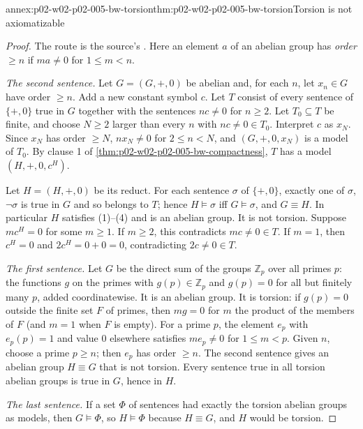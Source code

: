 \begin{annexitem}{annex:p02-w02-p02-005-bw-torsion}{thm:p02-w02-p02-005-bw-torsion}{Torsion is not axiomatizable}
\begin{proof}
The route is the source's \cite[ch.~A.1, \S2, p.~11]{Barwise1977FirstOrder}.
Here an element \(a\) of an abelian group has \emph{order \(\geq n\)} if
\(ma\neq0\) for \(1\leq m<n\).

\emph{The second sentence.}  Let \(G=(G,+,0)\) be abelian and, for each
\(n\), let \(x_n\in G\) have order \(\geq n\).  Add a new constant symbol
\(c\).  Let \(T\) consist of every sentence of \(\{+,0\}\) true in \(G\)
together with the sentences \(nc\neq0\) for \(n\geq2\).  Let
\(T_0\subseteq T\) be finite, and choose \(N\geq2\) larger than every
\(n\) with \(nc\neq0\in T_0\).  Interpret \(c\) as \(x_N\).  Since \(x_N\)
has order \(\geq N\), \(nx_N\neq0\) for \(2\leq n<N\), and
\((G,+,0,x_N)\) is a model of \(T_0\).  By clause 1 of
\cref{thm:p02-w02-p02-005-bw-compactness}, \(T\) has a model
\((H,+,0,c^H)\).

Let \(H=(H,+,0)\) be its reduct.  For each sentence \(\sigma\) of
\(\{+,0\}\), exactly one of \(\sigma\), \(\neg\sigma\) is true in \(G\) and
so belongs to \(T\); hence \(H\models\sigma\) iff \(G\models\sigma\), and
\(G\equiv H\).  In particular \(H\) satisfies (1)--(4) and is an abelian
group.  It is not torsion.  Suppose \(mc^H=0\) for some \(m\geq1\).  If
\(m\geq2\), this contradicts \(mc\neq0\in T\).  If \(m=1\), then
\(c^H=0\) and \(2c^H=0+0=0\), contradicting \(2c\neq0\in T\).

\emph{The first sentence.}  Let \(G\) be the direct sum of the groups
\(\mathbb Z_p\) over all primes \(p\): the functions \(g\) on the primes
with \(g(p)\in\mathbb Z_p\) and \(g(p)=0\) for all but finitely many
\(p\), added coordinatewise.  It is an abelian group.  It is torsion: if
\(g(p)=0\) outside the finite set \(F\) of primes, then \(mg=0\) for \(m\)
the product of the members of \(F\) (and \(m=1\) when \(F\) is empty).
For a prime \(p\), the element \(e_p\) with \(e_p(p)=1\) and value \(0\)
elsewhere satisfies \(me_p\neq0\) for \(1\leq m<p\).  Given \(n\), choose a
prime \(p\geq n\); then \(e_p\) has order \(\geq n\).  The second sentence
gives an abelian group \(H\equiv G\) that is not torsion.  Every sentence
true in all torsion abelian groups is true in \(G\), hence in \(H\).

\emph{The last sentence.}  If a set \(\Phi\) of sentences had exactly the
torsion abelian groups as models, then \(G\models\Phi\), so
\(H\models\Phi\) because \(H\equiv G\), and \(H\) would be torsion.
\end{proof}
\end{annexitem}

